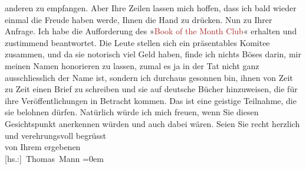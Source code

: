                anderen zu empfangen. Aber Ihre Zeilen lassen mich hoffen, dass ich bald wieder
               einmal die Freude haben werde, Ihnen die Hand zu drücken.\pend
           \pstart
           Nun zu Ihrer Anfrage. Ich habe die Aufforderung des »\textcolor{brown}{Book
                  of the Month Club}{}\ledrightnote{\textcolor{brown}{Book of The Month Club}}« erhalten und zustimmend beantwortet. Die Leute stellen
               sich ein präsentables Komitee zusammen, und da sie notorisch viel Geld haben, finde
               ich nichts Böses darin, mir meinen Namen honorieren zu lassen, zumal es ja in der Tat
               nicht ganz ausschliesslich der Name ist, sondern ich durchaus gesonnen bin, ihnen von
               Zeit zu Zeit einen Brief zu schreiben und sie auf deutsche Bücher hinzuweisen, die
               für ihre Veröffentlichungen in Betracht kommen. Das ist eine geistige Teilnahme, die
               sie belohnen {\pb}dürfen. Natürlich würde ich
               mich freuen, wenn Sie diesen Gesichtspunkt anerkennen würden und auch dabei
               wären.\pend
           \pstart
           Seien Sie recht herzlich und verehrungsvoll begrüsst{\\[\baselineskip]} von Ihrem ergebenen{\\[\baselineskip]}\spacefill\mbox{{[}hs.:{]} Thomas Mann}\pend
           \leftskip=0em{}\endnumbering{}  
      